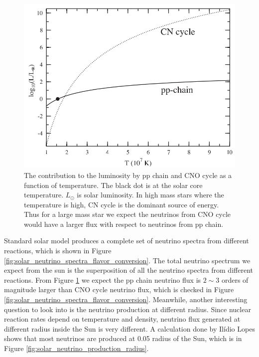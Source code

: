 \documentclass[%
 aip,
 jmp,%
 amsmath,amssymb,
 reprint,%
]{revtex4-1}
\begin{document}
\begin{figure}[!hbtp]
\centering
\includegraphics[width=\columnwidth]{assets/pp_chain_vs_cno.png}
\caption{The contribution to the luminosity by pp chain and CNO cycle as a function of temperature.\cite{Adelberger2011a} The black dot is at the solar core temperature. $L_{\odot}$ is solar luminosity. In high mass stars where the temperature is high, CN cycle is the dominant source of energy. Thus for a large mass star we expect the neutrinos from CNO cycle would have a larger flux with respect to neutrinos from pp chain.
}
\label{fig:pp_chain_vs_cno}
\end{figure}

Standard solar model produces a complete set of neutrino spectra from different reactions, which is shown in Figure \ref{fig:solar_neutrino_spectra_flavor_conversion}. The total neutrino spectrum we expect from the sun is the superposition of all the neutrino spectra from different reactions. From Figure \ref{fig:pp_chain_vs_cno} we expect the pp chain neutrino flux is $2\sim 3$ orders of magnitude larger than CNO cycle neutrino flux, which is checked in Figure \ref{fig:solar_neutrino_spectra_flavor_conversion}. Meanwhile, another interesting question to look into is the neutrino production at different radius. Since nuclear reaction rates depend on temperature and density, neutrino flux generated at different radius inside the Sun is very different. A calculation done by Ilídio Lopes shows that most neutrinos are produced at 0.05 radius of the Sun, which is in Figure \ref{fig:solar_neutrino_production_radius}.\cite{Lopes2013}
\end{document}
